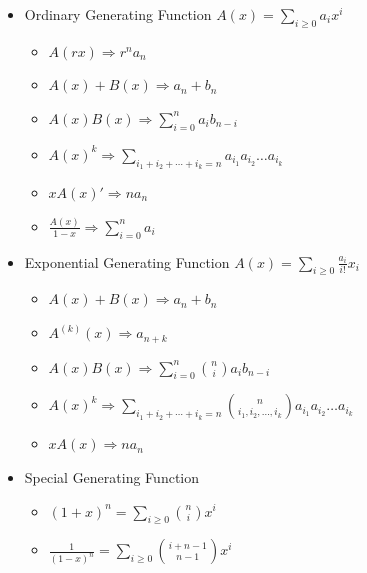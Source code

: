\begin{itemize}
\item Ordinary Generating Function
$A(x) = \sum_{i\ge 0} a_ix^i$
\begin{itemize}
    \item $A(rx)             \Rightarrow r^na_n$
    \item $A(x) + B(x)       \Rightarrow a_n + b_n$
    \item $A(x)B(x)          \Rightarrow \sum_{i=0}^{n} a_ib_{n-i}$
    \item $A(x)^k            \Rightarrow \sum_{i_1+i_2+\cdots+i_k=n} a_{i_1}a_{i_2}\ldots a_{i_k}$
    \item $xA(x)'            \Rightarrow na_n$
    \item $\frac{A(x)}{1-x}  \Rightarrow \sum_{i=0}^{n} a_i$
\end{itemize}
\item Exponential Generating Function
$A(x) = \sum_{i\ge 0} \frac{a_i}{i!}x_i$
\begin{itemize}
    \item $A(x) + B(x)       \Rightarrow a_n + b_n$
    \item $A^{(k)}(x)        \Rightarrow a_{n+k}$
    \item $A(x)B(x)          \Rightarrow \sum_{i=0}^{n} \binom{n}{i}a_ib_{n-i}$
    \item $A(x)^k            \Rightarrow \sum_{i_1+i_2+\cdots+i_k=n} \binom{n}{i_1, i_2, \ldots, i_k}a_{i_1}a_{i_2}\ldots a_{i_k}$
    \item $xA(x)             \Rightarrow na_n$
\end{itemize}
\item Special Generating Function
\begin{itemize}
    \item $(1+x)^n           = \sum_{i\ge 0} \binom{n}{i}x^i$
    \item $\frac{1}{(1-x)^n} = \sum_{i\ge 0} \binom{i+n-1}{n-1}x^i$
\end{itemize}
\end{itemize}
